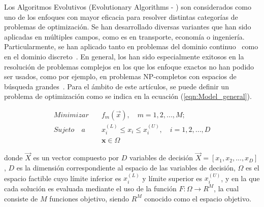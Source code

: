 Los Algoritmos Evolutivos (Evolutionary Algorithms - \EAS{}) son considerados como uno de los enfoques con mayor eficacia para resolver distintas categorías de 
problemas de optimización.
%
Se han desarrollado diversas variantes que han sido aplicadas en múltiples campos, como es en transporte, economía o ingeniería.
%
Particularmente, se han aplicado tanto en problemas del dominio continuo~\cite{glover2005handbook} como en el dominio discreto~\cite{Joel:Dynamic_FAP}.
%
En general, los \EAS{} han sido especialmente exitosos en la resolución de problemas complejos en los que los enfoque exactos
no han podido ser usados, como por ejemplo, en problemas NP-completos con espacios de búsqueda grandes~\cite{chakraborty2008advances}.
% 
Para el ámbito de este artículos, se puede definir un problema de optimización como se indica en la ecuación (\ref{eqn:Model_general}).

\begin{equation}
 \label{eqn:Model_general}
   \begin{split}
    Minimizar \quad & f_m(\vec{x}), \quad m = 1, 2,...,M;\\
   Sujeto \quad a \quad &  x_i^{(L)} \leq x_i \leq x_i^{(U)}, \quad i=1,2,..., D \\
   & \mathbf{x} \in \Omega
   \end{split}
\end{equation}

donde $\vec{X}$ es un vector compuesto por $D$ variables de decisión $\vec{X} = [x_1, x_2, ..., x_D]$, $D$ es la dimensión correspondiente al espacio de las variables de decisión, $\Omega$ es el espacio factible cuyo límite inferior es $x_i^{(L)}$ y límite superior es $x_i^{(U)}$, y en la que cada solución es evaluada mediante el uso de la función $F : \Omega \rightarrow R^M$, la cual consiste de $M$ funciones objetivo, siendo $R^M$ conocido como el espacio objetivo.

